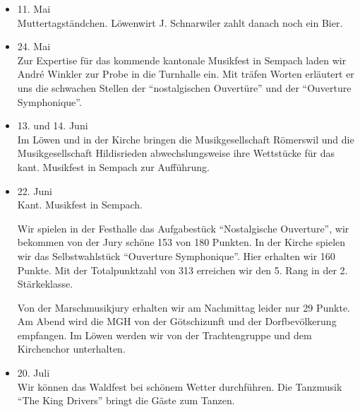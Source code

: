 \begin{history}
\begin{itemize}
        \item[]11. Mai\\
        Muttertagständchen. Löwenwirt J. Schnarwiler zahlt danach noch ein Bier.

        \item[]24. Mai\\
        Zur Expertise für das kommende kantonale Musikfest in Sempach laden wir
        André Winkler zur Probe in die Turnhalle ein. Mit träfen Worten
        erläutert er uns die schwachen Stellen der \enquote{nostalgischen Ouvertüre}
        und der \enquote{Ouverture Symphonique}.

        \item[]13. und 14. Juni\\
        Im Löwen und in der Kirche bringen die Musikgesellschaft Römerswil und
        die Musikgesellschaft Hildisrieden abwechslungsweise ihre Wettstücke für
        das kant. Musikfest in Sempach zur Aufführung.

        \item[]22. Juni\\
        Kant. Musikfest in Sempach.

        Wir spielen in der Festhalle das Aufgabestück \enquote{Nostalgische
            Ouverture}, wir bekommen von der Jury schöne 153 von 180 Punkten. In
        der Kirche spielen wir das Selbstwahlstück \enquote{Ouverture
            Symphonique}. Hier erhalten wir 160 Punkte. Mit der Totalpunktzahl
        von 313 erreichen wir den 5. Rang in der 2. Stärkeklasse.

        Von der Marschmusikjury erhalten wir am Nachmittag leider nur 29 Punkte.
        Am Abend wird die MGH von der Götschizunft und der Dorfbevölkerung
        empfangen. Im Löwen werden wir von der Trachtengruppe und dem
        Kirchenchor unterhalten.

        \item[]20. Juli\\
        Wir können das Waldfest bei schönem Wetter durchführen. Die Tanzmusik
        \enquote{The King Drivers} bringt die Gäste zum Tanzen.



    \end{itemize}

\end{history}
